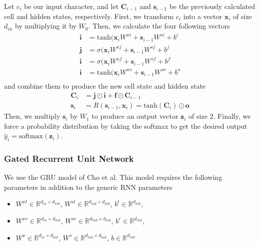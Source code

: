 \documentclass[11pt]{article}
\begin{document}
Let $c_i$ be our input character, and let $\mathbf{C}_{i-1}$ and $\mathbf{s}_{i-1}$ be the previously calculated cell and hidden states, respectively. First, we transform $c_i$ into a vector $\mathbf{x}_i$ of size $d_{in}$ by multiplying it by $W_0$. Then, we calculate the four following vectors
\begin{align*}
  \mathbf{i} &= \text{tanh}(\mathbf{x}_iW^{xi} + \mathbf{s}_{i-1}W^{si} + b^i \\
  \mathbf{j} &= \sigma(\mathbf{x}_iW^{xj} + \mathbf{s}_{i-1}W^{sj} + b^j \\
  \mathbf{i} &= \sigma(\mathbf{x}_iW^{xf} + \mathbf{s}_{i-1}W^{sf} + b^f \\
  \mathbf{i} &= \text{tanh}(\mathbf{x}_iW^{xo} + \mathbf{s}_{i-1}W^{so} + b^o \\
\end{align*}
and combine them to produce the new cell state and hidden state
\begin{align*}
  \mathbf{C}_i &= \mathbf{j} \odot \mathbf{i} + \mathbf{f} \odot \mathbf{C}_{i-1} \\
  \mathbf{s}_i &= R(\mathbf{s}_{i-1}, \mathbf{x}_i) = \text{tanh}(\mathbf{C}_i) \odot \mathbf{o}
\end{align*}
Then, we multiply $\mathbf{s}_i$ by $W_1$ to produce an output vector $\mathbf{z}_i$ of size $2$. Finally, we force a probability distribution by taking the softmax to get the desired output $\hat{y}_i = \text{softmax}(\mathbf{z}_i)$. 

\subsubsection{Gated Recurrent Unit Network}

We use the GRU model of Cho et al. This model requires the following parameters in addition to the generic RNN parameters
\begin{itemize}
  \item $W^{xt} \in \mathbb{R}^{d_{in} \times d_{hid}}$, $W^{st} \in \mathbb{R}^{d_{hid} \times d_{hid}}$, $b^t \in \mathbb{R}^{d_{hid}}$, 
  \item $W^{xr} \in \mathbb{R}^{d_{in} \times d_{hid}}$, $W^{sr} \in \mathbb{R}^{d_{hid} \times d_{hid}}$, $b^r \in \mathbb{R}^{d_{hid}}$, 
  \item $W^x \in \mathbb{R}^{d_{in} \times d_{hid}}$, $W^s \in \mathbb{R}^{d_{hid} \times d_{hid}}$, $b \in \mathbb{R}^{d_{hid}}$
\end{itemize}
\end{document}

